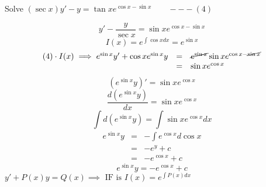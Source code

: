 \begin{eg}
Solve \((\sec x)y' - y = \tan x e^{\cos x - \sin x} \quad \quad ---(4)\)

\soln
\[\displaystyle y' - \frac{y}{\sec x} = \sin x e^{\cos x - \sin x}\]
\[I(x) = e^{\int \cos x dx} = e^{\sin x}\]
\[\begin{array}{rcl}
(4) \cdot I(x) \implies e^{\sin x}y' + \cos x e^{\sin x}y & = & \cancel{e^{\sin x}} \sin x e^{\cos x - \cancel{\sin x}}\\
& = & \sin x e^{\cos x}
\end{array}\]
\[(e^{\sin x}y)' = \sin x e^{\cos x}\]
\[\displaystyle \frac{d(e^{\sin x}y)}{dx} = \sin x e^{\cos x}\]
\[\int d(e^{\sin x}y) = \int \sin x e^{\cos x}dx\]
\[\begin{array}{rcl}
e^{\sin x}y & = & \displaystyle -\int e^{\cos x}d\cos x\\
& = & -e^y + c\\
& = & -e^{\cos x} + c
\end{array}\]
\[e^{\sin x}y = -e^{\cos x} + c\]
\(y' + P(x)y = Q(x) \implies \text{ IF is } I(x) = e^{\int P(x)dx}\)
\end{eg}
